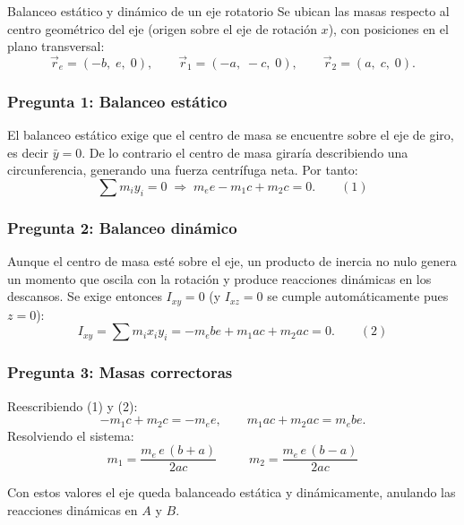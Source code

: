\begin{solucion}{Balanceo estático y dinámico de un eje rotatorio}
Se ubican las masas respecto al centro geométrico del eje (origen sobre el eje de rotación
$x$), con posiciones en el plano transversal:
$$\vec{r}_e=(-b,\;e,\;0),\qquad \vec{r}_1=(-a,\;-c,\;0),\qquad \vec{r}_2=(a,\;c,\;0).$$

\subsubsection*{Pregunta 1: Balanceo estático}

El balanceo estático exige que el centro de masa se encuentre sobre el eje de giro, es decir
$\bar{y}=0$. De lo contrario el centro de masa giraría describiendo una circunferencia,
generando una fuerza centrífuga neta. Por tanto:
$$\sum m_i y_i = 0 \;\Longrightarrow\; m_e e - m_1 c + m_2 c = 0. \qquad (1)$$

\subsubsection*{Pregunta 2: Balanceo dinámico}

Aunque el centro de masa esté sobre el eje, un producto de inercia no nulo genera un momento
que oscila con la rotación y produce reacciones dinámicas en los descansos. Se exige entonces
$I_{xy}=0$ (y $I_{xz}=0$ se cumple automáticamente pues $z=0$):
$$I_{xy} = \sum m_i x_i y_i = -m_e b e + m_1 a c + m_2 a c = 0. \qquad (2)$$

\subsubsection*{Pregunta 3: Masas correctoras}

Reescribiendo (1) y (2):
$$-m_1 c + m_2 c = -m_e e,\qquad m_1 a c + m_2 a c = m_e b e.$$
Resolviendo el sistema:
$$\boxed{\;m_1 = \frac{m_e\,e\,(b+a)}{2ac}\;}\qquad
\boxed{\;m_2 = \frac{m_e\,e\,(b-a)}{2ac}\;}$$

Con estos valores el eje queda balanceado estática y dinámicamente, anulando las reacciones
dinámicas en $A$ y $B$.
\end{solucion}
